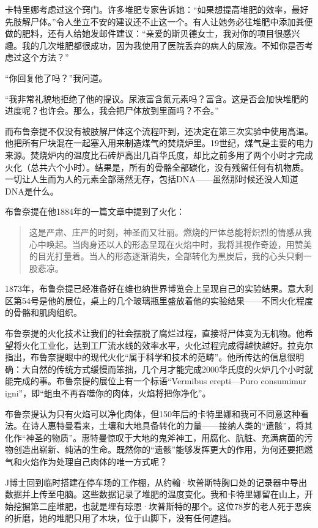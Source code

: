 \documentclass[12pt,oneside]{book}
\begin{document}
\begin{bookref}[frametitle={\cite{好好告别：世界葬礼观察手记}}]
卡特里娜考虑过这个窍门。许多堆肥专家告诉她：“如果想提高堆肥的效率，最好先肢解尸体。”令人坐立不安的建议还不止这一个。有人让她务必往堆肥中添加粪便做的肥料，还有人给她发邮件建议：“亲爱的斯贝德女士，我对你的项目很感兴趣。我的几次堆肥都很成功，因为我使用了医院丢弃的病人的尿液。不知你是否考虑过这个方法？”

“你回复他了吗？”我问道。

“我非常礼貌地拒绝了他的提议。尿液富含氮元素吗？富含。这是否会加快堆肥的进度呢？也许会。那么，我会把尸体放到里面吗？不会。”

而布鲁奈提不仅没有被肢解尸体这个流程吓到，还决定在第三次实验中使用高温。他把所有尸块混在一起塞入用来制造煤气的焚烧炉里。19世纪，煤气是主要的电力来源。焚烧炉内的温度比石砖炉高出几百华氏度，却比之前多用了两个小时才完成火化（总共六个小时）。结果是，所有的骨骼全部碳化，没有残留任何有机物质。一切让人生而为人的元素全部荡然无存，包括DNA——虽然那时候还没人知道DNA是什么。

布鲁奈提在他1884年的一篇文章中提到了火化：

\begin{quotation}
这是严肃、庄严的时刻，神圣而又壮丽。燃烧的尸体总能将炽烈的情感从我心中唤起。当肉身还以人的形态呈现在火焰中时，我将其视作奇迹，用赞美的目光打量着。当人的形态逐渐消失，全部转化为黑炭后，我的心头只剩一股悲凉。
\end{quotation}

1873年，布鲁奈提已经准备好在维也纳世界博览会上呈现自己的实验结果。意大利区第54号是他的展位，桌上的几个玻璃瓶里盛放着他的实验结果——不同火化程度的骨骼和肌肉组织。

布鲁奈提的火化技术让我们的社会摆脱了腐烂过程，直接将尸体变为无机物。他希望将火化工业化，达到工厂流水线的效率水平，火化过程完成得越快越好。拉克尔指出，布鲁奈提眼中的现代火化“属于科学和技术的范畴”。他所传达的信息很明确：大自然的传统方式缓慢而笨拙，几个月才能完成2000华氏度的火炉几个小时就能完成的事。布鲁奈提的展位上有一个标语“Vermibus erepti—Puro consumimur igni”，即“蛆虫不再吞噬你的肉体，火焰将把你净化”。

布鲁奈提认为只有火焰可以净化肉体，但150年后的卡特里娜和我可不同意这种看法。在诗人惠特曼看来，土壤和大地具备转化的力量——接纳人类的“遗骸”，将其化作“神圣的物质”。惠特曼惊叹于大地的鬼斧神工，用腐化、肮脏、充满病菌的污物创造出崭新、纯洁的生命。既然你的“遗骸”能够发挥更大的作用，为何还要把燃气和火焰作为处理自己肉体的唯一方式呢？

J博士回到临时搭建在停车场的工作棚，从约翰·坎普斯特胸口处的记录器中导出数据并上传至电脑。这些数据记录了堆肥的温度变化。我和卡特里娜留在山上，开始挖掘第二座堆肥，也就是埋有琼恩·坎普斯特的那个。这位78岁的老人死于恶疾的折磨，她的堆肥只用了木块，位于山脚下，没有任何遮挡。


\end{bookref}
\end{document}
